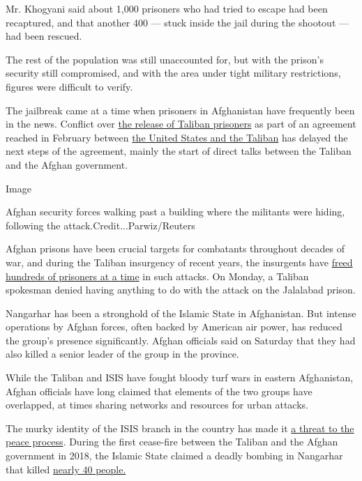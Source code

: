 Mr. Khogyani said about 1,000 prisoners who had tried to escape had been
recaptured, and that another 400 --- stuck inside the jail during the
shootout --- had been rescued.

The rest of the population was still unaccounted for, but with the
prison's security still compromised, and with the area under tight
military restrictions, figures were difficult to verify.

The jailbreak came at a time when prisoners in Afghanistan have
frequently been in the news. Conflict over
\href{https://www.nytimes.com/2020/07/28/world/asia/afghanistan-cease-fire-taliban.html}{the
release of Taliban prisoners} as part of an agreement reached in
February between
\href{https://www.nytimes.com/2020/02/29/world/asia/us-taliban-deal.html}{the
United States and the Taliban} has delayed the next steps of the
agreement, mainly the start of direct talks between the Taliban and the
Afghan government.

Image

Afghan security forces walking past a building where the militants were
hiding, following the attack.Credit...Parwiz/Reuters

Afghan prisons have been crucial targets for combatants throughout
decades of war, and during the Taliban insurgency of recent years, the
insurgents have
\href{https://www.nytimes.com/2011/04/26/world/asia/26afghanistan.html}{freed
hundreds of prisoners at a time} in such attacks. On Monday, a Taliban
spokesman denied having anything to do with the attack on the Jalalabad
prison.

Nangarhar has been a stronghold of the Islamic State in Afghanistan. But
intense operations by Afghan forces, often backed by American air power,
has reduced the group's presence significantly. Afghan officials said on
Saturday that they had also killed a senior leader of the group in the
province.

While the Taliban and ISIS have fought bloody turf wars in eastern
Afghanistan, Afghan officials have long claimed that elements of the two
groups have overlapped, at times sharing networks and resources for
urban attacks.

The murky identity of the ISIS branch in the country has made it
\href{https://www.nytimes.com/2019/08/20/world/asia/isis-afghanistan-peace.html}{a
threat to the peace process}. During the first cease-fire between the
Taliban and the Afghan government in 2018, the Islamic State claimed a
deadly bombing in Nangarhar that killed
\href{https://www.nytimes.com/2018/06/16/world/asia/afghanistan-explosion-taliban-ceasefire.html}{nearly
40 people.}

